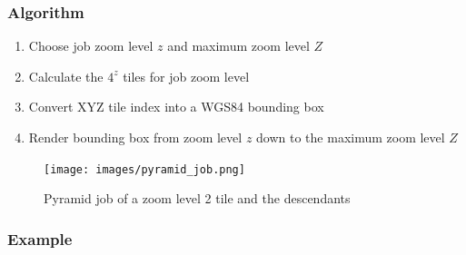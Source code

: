 \subsubsection*{Algorithm}

\begin{enumerate}  
    \item Choose job zoom level $z$ and maximum zoom level $Z$
    \item Calculate the $4^z$ tiles for job zoom level
    \item Convert XYZ tile index into a WGS84 bounding box
    \item Render bounding box from zoom level $z$ down to the maximum zoom level $Z$
\end{enumerate}

\begin{figure}[H]
  \centering
  \texttt{[image: images/pyramid\_job.png]}
  \caption{Pyramid job of a zoom level 2 tile and the descendants}
\end{figure}

\subsubsection*{Example}

